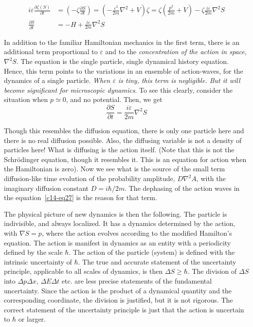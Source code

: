 {\fontsize{9}{9}\selectfont\begin{align*}
i \varepsilon \frac{\partial \zeta (S)}{\partial t} & = \left(-\zeta \frac{\partial S}{\partial t} \right) = \left(-\frac{\varepsilon^2}{2m} \nabla^2 + V \right) \zeta = \zeta \left(\frac{p^2}{2m}  + V\right) - \zeta \frac{i\varepsilon}{2m} \nabla^2 S \tag{25}\label{c14-eq25}\\
\frac{\partial S}{\partial t} & = - H + \frac{i \varepsilon}{2m} \nabla^2 S\tag{26}\label{c14-eq26} 
\end{align*}}

In addition to the familiar Hamiltonian mechanics in the first term, there is an additional
term proportional to $\varepsilon$ and to the \textit{concentration of the action in space}, $\nabla^2 S$. The equation
is the single particle, single dynamical history equation. Hence, this term points to the
variations in an ensemble of action-waves, for the dynamics of a single particle. \textit{When $\varepsilon$ is
tiny, this term is negligible. But it will become significant for microscopic dynamics}. To see
this clearly, consider the situation when $p \simeq 0$, and no potential. Then, we get
\begin{equation*}
\frac{\partial S}{\partial t} = \frac{i\varepsilon}{2m} \nabla^2 S \tag{27}\label{c14-eq27}
\end{equation*}

Though this resembles the diffusion equation, there is only one particle here and there is no
real diffusion possible. Also, the diffusing variable is not a density of particles here! What
is diffusing is the action itself. (Note that this is not the Schr\"{o}dinger equation, though it
resembles it. This is an equation for action when the Hamiltonian is zero). Now we see what
is the source of the small term diffusion-like time evolution of the probability amplitude,
$D \nabla^2 A$, with the imaginary diffusion constant $D = i \hbar /2m$. The dephasing of the action
waves in the equation~\ref{c14-eq27} is the reason for that term.

The physical picture of new dynamics is then the following. The particle is indivisible,
and always localized. It has a dynamics determined by the action, with $\nabla S = p$, where
the action evolves according to the modified Hamilton's equation. The action is manifest in
dynamics as an entity with a periodicity defined by the scale $\hbar$. The action of the particle
(system) is defined with the intrinsic uncertainty of $\hbar$. The true and accurate statement of
the uncertainty principle, applicable to all scales of dynamics, is then $\Delta S  \geq \hbar$. The division
of $\Delta S$ into $\Delta p \Delta x$, $\Delta E \Delta t$ etc. are less precise statements of the fundamental uncertainty.
Since the action is the product of a dynamical quantity and the corresponding coordinate,
the division is justified, but it is not rigorous. The correct statement of the uncertainty
principle is just that the action is uncertain to $\hbar$ or larger.

